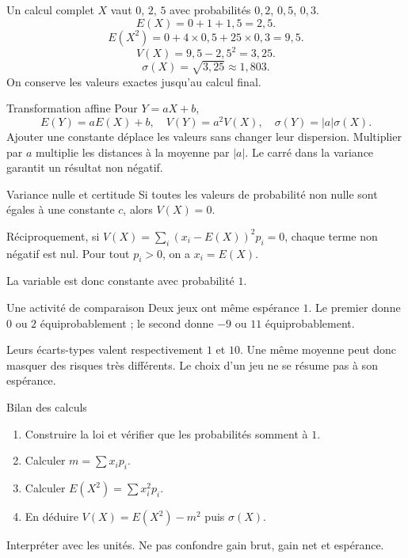 \documentclass[aspectratio=169,12pt]{beamer}
\begin{document}
\renewcommand{\slidekind}{MÉTHODE \& EXEMPLE}
\begin{frame}[t,fragile]{Un calcul complet}
$X$ vaut $0$, $2$, $5$ avec probabilités $0,2$, $0,5$, $0,3$.\[E(X)=0+1+1,5=2,5.\]\[E(X^2)=0+4\times0,5+25\times0,3=9,5.\]\[V(X)=9,5-2,5^2=3,25.\]\[\sigma(X)=\sqrt{3,25}\approx1,803.\]On conserve les valeurs exactes jusqu’au calcul final.
\end{frame}
\renewcommand{\slidekind}{COMPRENDRE}
\begin{frame}[t,fragile]{Transformation affine}
Pour $Y=aX+b$,\[E(Y)=aE(X)+b,\quad V(Y)=a^2V(X),\quad\sigma(Y)=|a|\sigma(X).\]Ajouter une constante déplace les valeurs sans changer leur dispersion. Multiplier par $a$ multiplie les distances à la moyenne par $|a|$. Le carré dans la variance garantit un résultat non négatif.
\end{frame}
\renewcommand{\slidekind}{COMPRENDRE}
\begin{frame}[t,fragile]{Variance nulle et certitude}
Si toutes les valeurs de probabilité non nulle sont égales à une constante $c$, alors $V(X)=0$.\medskip\par Réciproquement, si $V(X)=\sum_i(x_i-E(X))^2p_i=0$, chaque terme non négatif est nul. Pour tout $p_i>0$, on a $x_i=E(X)$.\medskip\par La variable est donc constante avec probabilité $1$.
\end{frame}
\renewcommand{\slidekind}{COMPRENDRE}
\begin{frame}[t,fragile]{Une activité de comparaison}
Deux jeux ont même espérance $1$. Le premier donne $0$ ou $2$ équiprobablement ; le second donne $-9$ ou $11$ équiprobablement.\medskip\par Leurs écarts-types valent respectivement $1$ et $10$. Une même moyenne peut donc masquer des risques très différents. Le choix d’un jeu ne se résume pas à son espérance.
\end{frame}
\renewcommand{\slidekind}{MÉTHODE \& EXEMPLE}
\begin{frame}[t,fragile]{Bilan des calculs}
\begin{enumerate}\item Construire la loi et vérifier que les probabilités somment à $1$.\item Calculer $m=\sum x_ip_i$.\item Calculer $E(X^2)=\sum x_i^2p_i$.\item En déduire $V(X)=E(X^2)-m^2$ puis $\sigma(X)$.\end{enumerate}Interpréter avec les unités. Ne pas confondre gain brut, gain net et espérance.
\end{frame}
\end{document}
